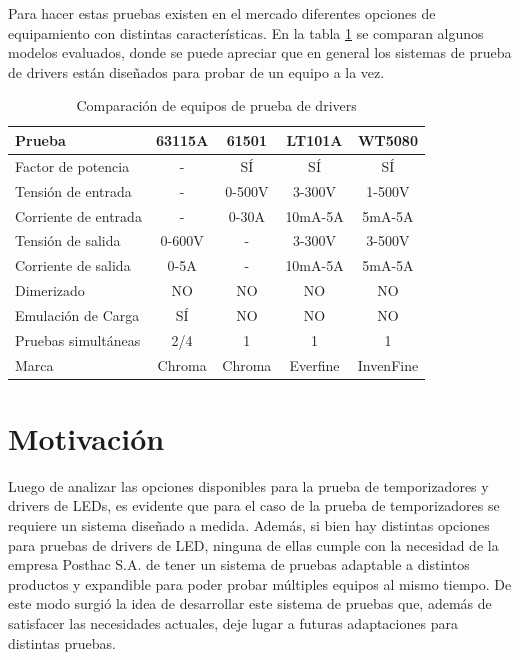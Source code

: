 	Para hacer estas pruebas existen en el mercado diferentes opciones  de equipamiento con distintas características. En la tabla \ref{tab:ProbadoresDrivers} se comparan algunos modelos evaluados, donde se puede apreciar que en general los sistemas de prueba de drivers están diseñados para probar de un equipo a la vez.
	
	\begin{table}[h]
	\centering
	\caption[Tabla de comparación de equipos de prueba de drivers]{Comparación de equipos de prueba de drivers}
	\begin{tabular}{l c c c c}    
		\toprule
		\textbf{Prueba} 	 & \textbf{63115A} & \textbf{61501}& \textbf{LT101A}		& \textbf{WT5080}  \\
		\midrule
		Factor de potencia & - & SÍ & SÍ & SÍ \\		
		Tensión de entrada	 & - & 0-500V & 3-300V & 1-500V \\
		Corriente de entrada& - & 0-30A & 10mA-5A & 5mA-5A \\
		Tensión de salida & 0-600V & - & 3-300V & 3-500V \\		
		Corriente de salida & 0-5A & - & 10mA-5A & 5mA-5A \\		
		Dimerizado & NO & NO & NO & NO \\		
		Emulación de Carga & SÍ & NO & NO & NO \\
		Pruebas simultáneas &2/4 & 1 & 1 & 1 \\
		Marca & Chroma & Chroma & Everfine & InvenFine \\
		\bottomrule
		\hline
	\end{tabular}
	\label{tab:ProbadoresDrivers}
\end{table}

\section{Motivación}

Luego de analizar las opciones disponibles para la prueba de temporizadores y drivers de LEDs, es evidente que para el caso de la prueba de temporizadores se requiere un sistema diseñado a medida. Además, si bien hay distintas opciones para pruebas de drivers de LED, ninguna de ellas cumple con la necesidad de la empresa Posthac S.A. de tener un sistema de pruebas adaptable a distintos productos y expandible para poder probar múltiples equipos al mismo tiempo. De este modo surgió la idea de desarrollar este sistema de pruebas que, además de satisfacer las necesidades actuales, deje lugar a futuras adaptaciones para distintas pruebas.

